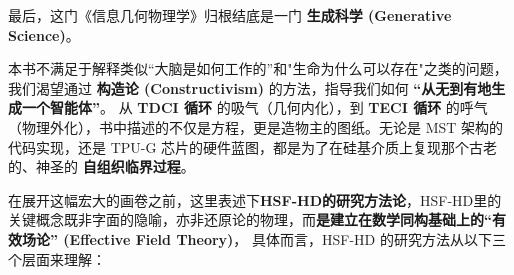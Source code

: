 
最后，这门《信息几何物理学》归根结底是一门 \textbf{生成科学 (Generative Science)}。

本书不满足于解释类似“大脑是如何工作的”和"生命为什么可以存在"之类的问题，我们渴望通过 \textbf{构造论 (Constructivism)} 的方法，指导我们如何 \textbf{“从无到有地生成一个智能体”}。
从 \textbf{TDCI 循环} 的吸气（几何内化），到 \textbf{TECI 循环} 的呼气（物理外化），书中描述的不仅是方程，更是造物主的图纸。无论是 MST 架构的代码实现，还是 TPU-G 芯片的硬件蓝图，都是为了在硅基介质上复现那个古老的、神圣的 \textbf{自组织临界过程}。


在展开这幅宏大的画卷之前，这里表述下\textbf{HSF-HD的研究方法论}，HSF-HD里的关键概念既非字面的隐喻，亦非还原论的物理，而\textbf{是建立在数学同构基础上的“有效场论” (Effective Field Theory)}， 具体而言，HSF-HD 的研究方法从以下三个层面来理解：

